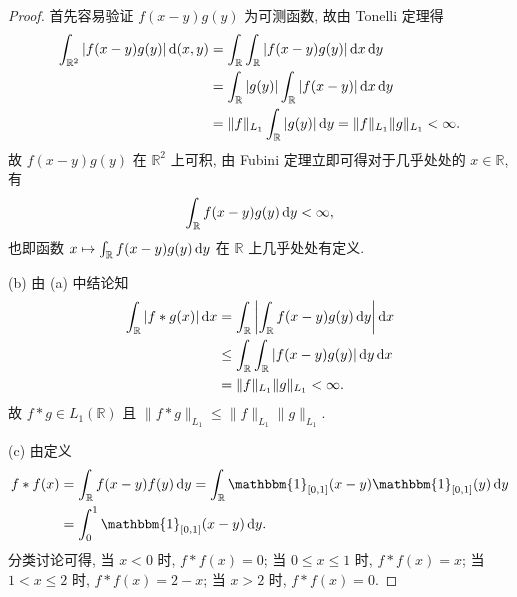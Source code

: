 \begin{proof}
    首先容易验证 $f(x-y)g(y)$ 为可测函数, 故由 Tonelli 定理得
    \begin{align*}
        \int_{\mathbb{R}^2} |f(x-y)g(y)|\mathop{}\!\mathrm{d}(x,y)
        & =\int_{\mathbb{R}}\int_{\mathbb{R}} |f(x-y)g(y)|\mathop{}\!\mathrm{d} x\mathop{}\!\mathrm{d} y \\
        & =\int_{\mathbb{R}}|g(y)|\int_{\mathbb{R}} |f(x-y)|\mathop{}\!\mathrm{d} x\mathop{}\!\mathrm{d} y \\
        & =\|f\|_{L_1}\int_{\mathbb{R}}|g(y)|\mathop{}\!\mathrm{d} y=\|f\|_{L_1}\|g\|_{L_1}<\infty.
    \end{align*}
    故 $f(x-y)g(y)$ 在 $\mathbb{R}^2$ 上可积, 由 Fubini 定理立即可得对于几乎处处的 $x\in\mathbb{R}$, 有
    \[\int_{\mathbb{R}}f(x-y)g(y)\mathop{}\!\mathrm{d} y<\infty,\]
    也即函数 $x\mapsto\int_{\mathbb{R}}f(x-y)g(y)\mathop{}\!\mathrm{d} y$ 在 $\mathbb{R}$ 上几乎处处有定义.

    (b) 由 (a) 中结论知
    \begin{align*}
        \int_{\mathbb{R}}|f*g(x)|\mathop{}\!\mathrm{d} x
        & =\int_{\mathbb{R}}\left|\int_{\mathbb{R}}f(x-y)g(y)\mathop{}\!\mathrm{d} y\right|\mathop{}\!\mathrm{d} x \\
        & \leq\int_{\mathbb{R}}\int_{\mathbb{R}}|f(x-y)g(y)|\mathop{}\!\mathrm{d} y\mathop{}\!\mathrm{d} x \\
        & =\|f\|_{L_1}\|g\|_{L_1}<\infty.
    \end{align*}
    故 $f*g\in L_1(\mathbb{R})$ 且 $\|f*g\|_{L_1}\leq\|f\|_{L_1}\|g\|_{L_1}$.

    (c) 由定义
    \begin{align*}
        f*f(x)
        & =\int_{\mathbb{R}} f(x-y)f(y)\diff y=\int_{\mathbb{R}} \mathbbm{1}_{[0,1]}(x-y)\mathbbm{1}_{[0,1]}(y)\diff y \\
        & =\int_0^1 \mathbbm{1}_{[0,1]}(x-y)\diff y.
    \end{align*}
    分类讨论可得, 当 $x<0$ 时, $f*f(x)=0$;
    当 $0\leq x\leq 1$ 时, $f*f(x)=x$;
    当 $1<x\leq 2$ 时, $f*f(x)=2-x$;
    当 $x>2$ 时, $f*f(x)=0$.
\end{proof}


